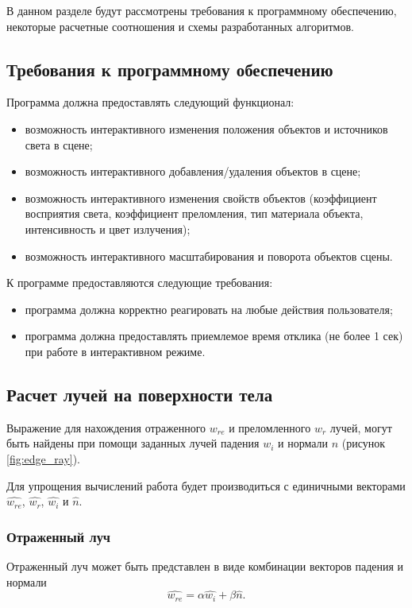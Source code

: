 В данном разделе будут рассмотрены требования к программному обеспечению,
некоторые расчетные соотношения и схемы разработанных алгоритмов.

\subsection{Требования к программному обеспечению}
Программа должна предоставлять следующий функционал:
\begin{itemize}
    \item возможность интерактивного изменения положения объектов и источников
          света в сцене;
    \item возможность интерактивного добавления/удаления объектов в сцене;
    \item возможность интерактивного изменения свойств объектов (коэффициент
          восприятия света, коэффициент преломления, тип материала объекта,
          интенсивность и цвет излучения);
    \item возможность интерактивного масштабирования и поворота объектов сцены.
\end{itemize}
\vspace{\baselineskip}

К программе предоставляются следующие требования:
\begin{itemize}
    \item программа должна корректно реагировать на любые действия пользователя;
    \item программа должна предоставлять приемлемое время отклика
          (не более 1 сек) при работе в интерактивном режиме.
\end{itemize}

\subsection{Расчет лучей на поверхности тела}
Выражение для нахождения отраженного $w_{re}$ и преломленного $w_r$ лучей, могут
быть найдены при помощи заданных лучей падения $w_i$ и нормали $n$
(рисунок \ref{fig:edge_ray}).

Для упрощения вычислений работа будет производиться с единичными векторами
$\widehat{w_{re}}$, $\widehat{w_r}$, $\widehat{w_i}$ и $\widehat{n}$.

\subsubsection*{Отраженный луч}
Отраженный луч может быть представлен в виде комбинации векторов падения и
нормали
\[ \widehat{w_{re}} = \alpha \widehat{w_i} + \beta \widehat{n}. \]

